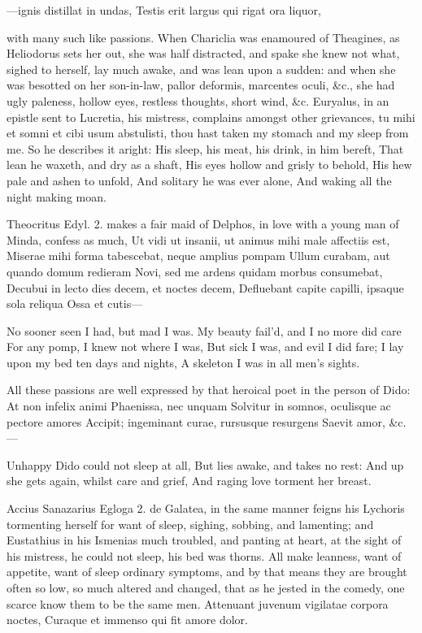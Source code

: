{---ignis distillat in undas,
Testis erit largus qui rigat ora liquor,

with many such like passions. When Chariclia was enamoured of
Theagines, as Heliodorus sets her out, she was half distracted,
and spake she knew not what, sighed to herself, lay much awake, and was
lean upon a sudden: and when she was besotted on her son-in-law,
pallor deformis, marcentes oculi, \&c., she had ugly paleness,
hollow eyes, restless thoughts, short wind, \&c. Euryalus, in an epistle
sent to Lucretia, his mistress, complains amongst other grievances, tu
mihi et somni et cibi usum abstulisti, thou hast taken my stomach and
my sleep from me. So he describes it aright:
His sleep, his meat, his drink, in him bereft,
That lean he waxeth, and dry as a shaft,
His eyes hollow and grisly to behold,
His hew pale and ashen to unfold,
And solitary he was ever alone,
And waking all the night making moan.

Theocritus Edyl. 2. makes a fair maid of Delphos, in love with a young
man of Minda, confess as much,
Ut vidi ut insanii, ut animus mihi male affectiis est,
Miserae mihi forma tabescebat, neque amplius pompam
Ullum curabam, aut quando domum redieram
Novi, sed me ardens quidam morbus consumebat,
Decubui in lecto dies decem, et noctes decem,
Defluebant capite capilli, ipsaque sola reliqua
Ossa et cutis---

No sooner seen I had, but mad I was.
My beauty fail'd, and I no more did care
For any pomp, I knew not where I was,
But sick I was, and evil I did fare;
I lay upon my bed ten days and nights,
A skeleton I was in all men's sights.

All these passions are well expressed by that heroical poet in
the person of Dido:
At non infelix animi Phaenissa, nec unquam
Solvitur in somnos, oculisque ac pectore amores
Accipit; ingeminant curae, rursusque resurgens
Saevit amor, \&c.---

Unhappy Dido could not sleep at all,
But lies awake, and takes no rest:
And up she gets again, whilst care and grief,
And raging love torment her breast.

Accius Sanazarius Egloga 2. de Galatea, in the same manner feigns his
Lychoris tormenting herself for want of sleep, sighing, sobbing,
and lamenting; and Eustathius in his Ismenias much troubled, and 
panting at heart, at the sight of his mistress, he could not sleep, his
bed was thorns. All make leanness, want of appetite, want of
sleep ordinary symptoms, and by that means they are brought often so
low, so much altered and changed, that as he jested in the
comedy, one scarce know them to be the same men.
Attenuant juvenum vigilatae corpora noctes,
Curaque et immenso qui fit amore dolor.

}
